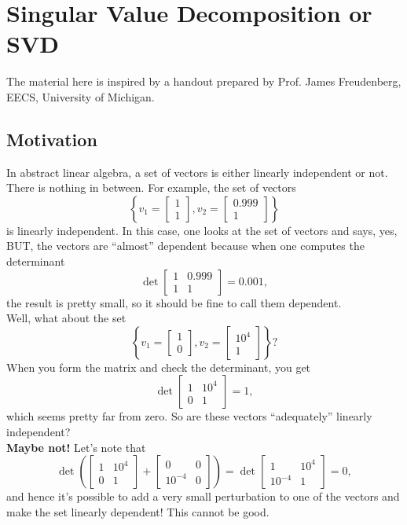 \section{Singular Value Decomposition or SVD}
The material here is inspired by a handout prepared by Prof. James Freudenberg, EECS, University of Michigan.

\subsection{Motivation}

In abstract linear algebra, a set of vectors is either linearly independent or not. There is nothing in between. For example, the set of vectors
$$\left\{ v_1 =  \left[ \begin{array}{l} 1 \\1 \end{array} \right] ,  v_2 =  \left[ \begin{array}{l} 0.999 \\1\end{array} \right] \right\}$$
is linearly independent. In this case, one looks at the set of vectors and says, yes, BUT, the vectors are ``almost'' dependent because when one computes the determinant
$$ \det  \left[ \begin{array}{ll} 1 & 0.999 \\1 & 1\end{array} \right] = 0.001,$$
the result is pretty small, so it should be fine to call them dependent. \\

Well, what about the set
$$\left\{ v_1 =  \left[ \begin{array}{l} 1 \\0 \end{array} \right] ,  v_2 =  \left[ \begin{array}{l} 10^4 \\1 \end{array} \right] \right\} ?$$
When you form the matrix and check the determinant, you get
$$ \det  \left[ \begin{array}{ll} 1 & 10^4 \\0& 1\end{array} \right] = 1,$$
which seems pretty far from zero. So are these vectors ``adequately'' linearly independent?\\

\textbf{Maybe not!} Let's note that
 $$\det\left(\left[ \begin{array}{ll} 1 & 10^4 \\0& 1\end{array} \right] +  \left[ \begin{array}{ll} 0 & 0 \\10^{-4}& 0\end{array} \right] \right)  =  \det \left[ \begin{array}{ll} 1 & 10^4 \\10^{-4}& 1\end{array} \right] =0,$$
and hence it's possible to add a very small perturbation to one of the vectors and make the set linearly dependent! This cannot be good.

